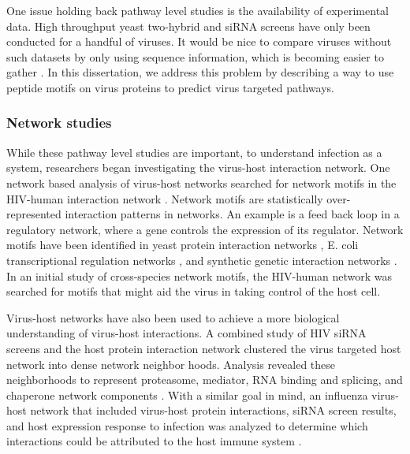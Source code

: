 One issue holding back pathway level studies is the availability of
experimental data. High throughput yeast two-hybrid and siRNA screens
have only been conducted for a handful of viruses. It would be nice to
compare viruses without such datasets by only using sequence
information, which is becoming easier to gather
\cite{munroe2010third}. In this dissertation, we address this problem
by describing a way to use peptide motifs on virus proteins to predict
virus targeted pathways.


\subsubsection{Network studies}

While these pathway level studies are important, to understand
infection as a system, researchers began investigating the virus-host
interaction network. One network based analysis of virus-host networks
searched for network motifs in the HIV-human interaction network
\cite{hivNetMotifs}. Network motifs are statistically over-represented
interaction patterns in networks. An example is a feed back loop in a
regulatory network, where a gene controls the expression of its
regulator. Network motifs have been identified in yeast protein
interaction networks \cite{wuchty2003evolutionary}, E. coli
transcriptional regulation networks \cite{shen2002network}, and
synthetic genetic interaction networks \cite{costanzo2010genetic}. In
an initial study of cross-species network motifs, the HIV-human
network was searched for motifs that might aid the virus in taking
control of the host cell.

Virus-host networks have also been used to achieve a more biological
understanding of virus-host interactions. A combined study of HIV
siRNA screens and the host protein interaction network clustered the
virus targeted host network into dense network neighbor
hoods. Analysis revealed these neighborhoods to represent proteasome,
mediator, RNA binding and splicing, and chaperone network components
\cite{bushman09}. With a similar goal in mind, an influenza virus-host
network that included virus-host protein interactions, siRNA screen
results, and host expression response to infection was analyzed to
determine which interactions could be attributed to the host immune
system \cite{shapira2009physical}.

